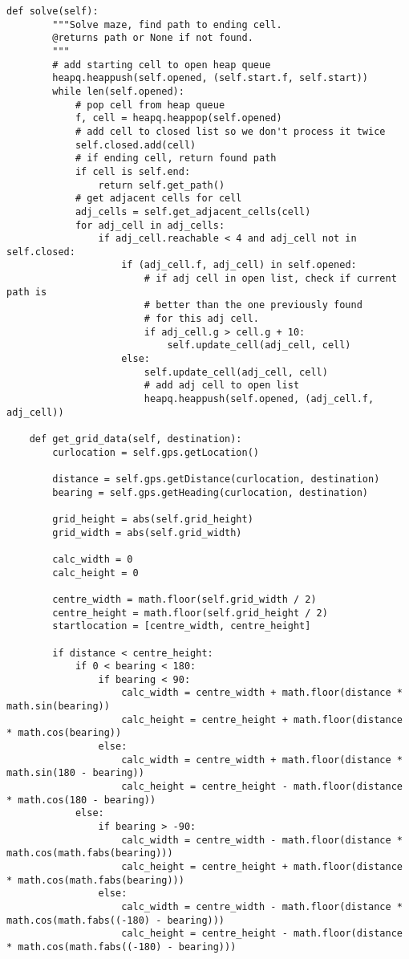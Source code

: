\begin{lstlisting}[style=custompython, label=astar-code, caption=A-Star algorithm class code]
    def solve(self):
        """Solve maze, find path to ending cell.
        @returns path or None if not found.
        """
        # add starting cell to open heap queue
        heapq.heappush(self.opened, (self.start.f, self.start))
        while len(self.opened):
            # pop cell from heap queue
            f, cell = heapq.heappop(self.opened)
            # add cell to closed list so we don't process it twice
            self.closed.add(cell)
            # if ending cell, return found path
            if cell is self.end:
                return self.get_path()
            # get adjacent cells for cell
            adj_cells = self.get_adjacent_cells(cell)
            for adj_cell in adj_cells:
                if adj_cell.reachable < 4 and adj_cell not in self.closed:
                    if (adj_cell.f, adj_cell) in self.opened:
                        # if adj cell in open list, check if current path is
                        # better than the one previously found
                        # for this adj cell.
                        if adj_cell.g > cell.g + 10:
                            self.update_cell(adj_cell, cell)
                    else:
                        self.update_cell(adj_cell, cell)
                        # add adj cell to open list
                        heapq.heappush(self.opened, (adj_cell.f, adj_cell))

    def get_grid_data(self, destination):
        curlocation = self.gps.getLocation()

        distance = self.gps.getDistance(curlocation, destination)
        bearing = self.gps.getHeading(curlocation, destination)

        grid_height = abs(self.grid_height)
        grid_width = abs(self.grid_width)

        calc_width = 0
        calc_height = 0

        centre_width = math.floor(self.grid_width / 2)
        centre_height = math.floor(self.grid_height / 2)
        startlocation = [centre_width, centre_height]

        if distance < centre_height:
            if 0 < bearing < 180:
                if bearing < 90:
                    calc_width = centre_width + math.floor(distance * math.sin(bearing))
                    calc_height = centre_height + math.floor(distance * math.cos(bearing))
                else:
                    calc_width = centre_width + math.floor(distance * math.sin(180 - bearing))
                    calc_height = centre_height - math.floor(distance * math.cos(180 - bearing))
            else:
                if bearing > -90:
                    calc_width = centre_width - math.floor(distance * math.cos(math.fabs(bearing)))
                    calc_height = centre_height + math.floor(distance * math.cos(math.fabs(bearing)))
                else:
                    calc_width = centre_width - math.floor(distance * math.cos(math.fabs((-180) - bearing)))
                    calc_height = centre_height - math.floor(distance * math.cos(math.fabs((-180) - bearing)))


\end{lstlisting}
